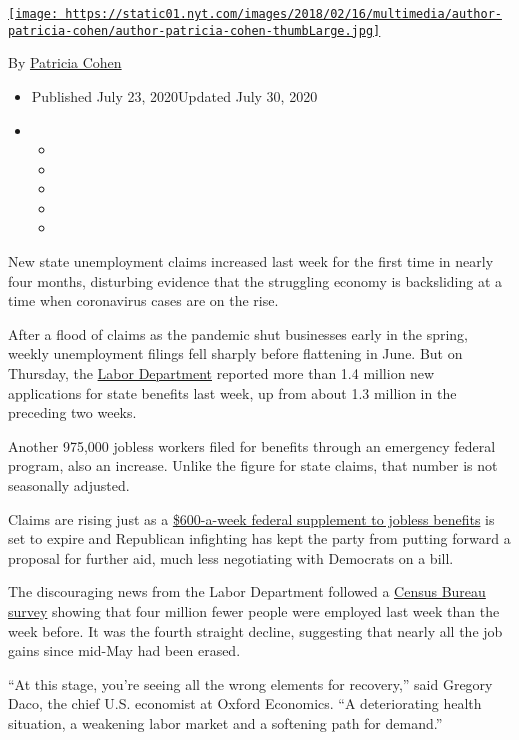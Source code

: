 \href{https://www.nytimes.com/by/patricia-cohen}{\texttt{[image: https://static01.nyt.com/images/2018/02/16/multimedia/author-patricia-cohen/author-patricia-cohen-thumbLarge.jpg]}}

By \href{https://www.nytimes.com/by/patricia-cohen}{Patricia Cohen}

\begin{itemize}
\item
  Published July 23, 2020Updated July 30, 2020
\item
  \begin{itemize}
  \item
  \item
  \item
  \item
  \item
  \end{itemize}
\end{itemize}

New state unemployment claims increased last week for the first time in
nearly four months, disturbing evidence that the struggling economy is
backsliding at a time when coronavirus cases are on the rise.

After a flood of claims as the pandemic shut businesses early in the
spring, weekly unemployment filings fell sharply before flattening in
June. But on Thursday, the
\href{https://oui.doleta.gov/press/2020/072320.pdf}{Labor Department}
reported more than 1.4 million new applications for state benefits last
week, up from about 1.3 million in the preceding two weeks.

Another 975,000 jobless workers filed for benefits through an emergency
federal program, also an increase. Unlike the figure for state claims,
that number is not seasonally adjusted.

Claims are rising just as a
\href{https://www.nytimes.com/2020/07/30/business/unemployment-payments-change.html}{\$600-a-week
federal supplement to jobless benefits} is set to expire and Republican
infighting has kept the party from putting forward a proposal for
further aid, much less negotiating with Democrats on a bill.

The discouraging news from the Labor Department followed a
\href{https://www.census.gov/householdpulsedata}{Census Bureau survey}
showing that four million fewer people were employed last week than the
week before. It was the fourth straight decline, suggesting that nearly
all the job gains since mid-May had been erased.

``At this stage, you're seeing all the wrong elements for recovery,''
said Gregory Daco, the chief U.S. economist at Oxford Economics. ``A
deteriorating health situation, a weakening labor market and a softening
path for demand.''

